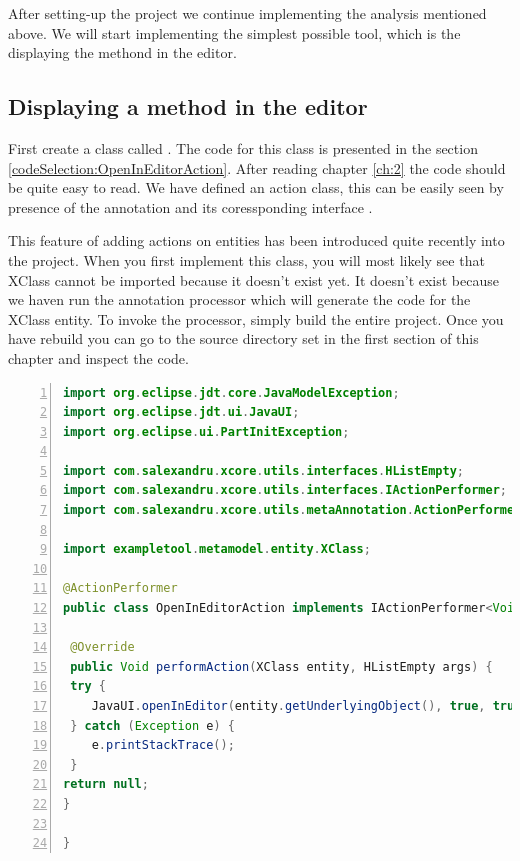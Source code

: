         After setting-up the project we continue implementing the analysis mentioned above. We will start implementing the simplest possible tool, which is the displaying the methond in the editor.

\subsection{Displaying a method in the editor}
       
        First create a class called . The code for this class is presented in the section \ref{codeSelection:OpenInEditorAction}.
After reading chapter \ref{ch:2} the code should be quite easy to read. We have defined an action class, this can be easily seen by presence of the annotation
 and its coressponding interface . 
       
        This feature of adding actions on entities has been introduced quite recently into the project. 
        When you first implement this class, you will most likely see that XClass cannot be imported because it doesn't exist yet.  It doesn't exist because we haven run the annotation processor 
which will generate the code for the XClass entity. To invoke the processor, simply build the entire project. Once you have rebuild you can go to the source directory set in the first section of
this chapter and inspect the code.

\small
\begin{lstlisting}[language=Java,numbers=left]
import org.eclipse.jdt.core.JavaModelException;
import org.eclipse.jdt.ui.JavaUI;
import org.eclipse.ui.PartInitException;

import com.salexandru.xcore.utils.interfaces.HListEmpty;
import com.salexandru.xcore.utils.interfaces.IActionPerformer;
import com.salexandru.xcore.utils.metaAnnotation.ActionPerformer;

import exampletool.metamodel.entity.XClass;

@ActionPerformer
public class OpenInEditorAction implements IActionPerformer<Void, XClass, HListEmpty> {

 @Override
 public Void performAction(XClass entity, HListEmpty args) {
 try {
    JavaUI.openInEditor(entity.getUnderlyingObject(), true, true);
 } catch (Exception e) {
    e.printStackTrace();
 }
return null;
}

}
\end{lstlisting}
\normalsize{}\label{codeSelection:OpenInEditorAction}

